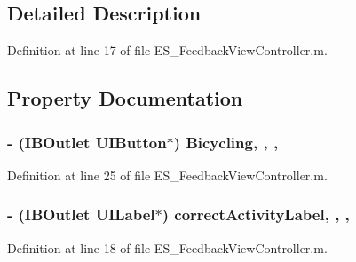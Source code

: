 \subsection{Detailed Description}


Definition at line 17 of file E\+S\+\_\+\+Feedback\+View\+Controller.\+m.



\subsection{Property Documentation}
\hypertarget{category_e_s___feedback_view_controller_07_08_ad47899efe98d569b087c0d64f30d3392}{
\subsubsection[{Bicycling}]{\setlength{\rightskip}{0pt plus 5cm}-\/ (I\+B\+Outlet U\+I\+Button$\ast$) Bicycling\hspace{0.3cm}{\ttfamily [read]}, {\ttfamily [write]}, {\ttfamily [nonatomic]}, {\ttfamily [strong]}}}\label{category_e_s___feedback_view_controller_07_08_ad47899efe98d569b087c0d64f30d3392}


Definition at line 25 of file E\+S\+\_\+\+Feedback\+View\+Controller.\+m.

\hypertarget{category_e_s___feedback_view_controller_07_08_a14a8497fab3b0e86608a9fb3eed36b7f}{
\subsubsection[{correct\+Activity\+Label}]{\setlength{\rightskip}{0pt plus 5cm}-\/ (I\+B\+Outlet U\+I\+Label$\ast$) correct\+Activity\+Label\hspace{0.3cm}{\ttfamily [read]}, {\ttfamily [write]}, {\ttfamily [nonatomic]}, {\ttfamily [weak]}}}\label{category_e_s___feedback_view_controller_07_08_a14a8497fab3b0e86608a9fb3eed36b7f}


Definition at line 18 of file E\+S\+\_\+\+Feedback\+View\+Controller.\+m.

